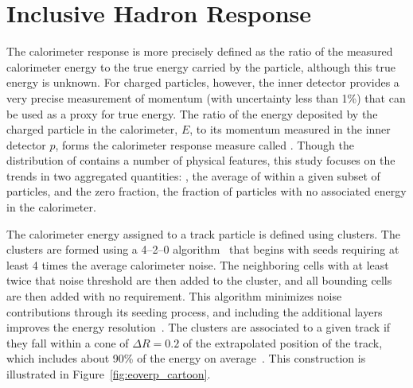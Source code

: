 
\section{Inclusive Hadron Response}
\label{sec:inclusive}

The calorimeter response is more precisely defined as the ratio of the measured calorimeter energy to the true energy carried by the particle, although this true energy is unknown. 
For charged particles, however, the inner detector provides a very precise measurement of momentum (with uncertainty less than 1\%) that can be used as a proxy for true energy.
The ratio of the energy deposited by the charged particle in the calorimeter, $E$, to its momentum measured in the inner detector $p$, forms the calorimeter response measure called \ep.
Though the distribution of \ep contains a number of physical features, this study focuses on the trends in two aggregated quantities: \epav, the average of \ep within a given subset of particles, and the zero fraction, the fraction of particles with no associated energy in the calorimeter.

The calorimeter energy assigned to a track particle is defined using clusters. 
The clusters are formed using a 4--2--0 algorithm~\cite{TopoClusters} that begins with seeds requiring at least 4 times the average calorimeter noise. 
The neighboring cells with at least twice that noise threshold are then added to the cluster, and all bounding cells are then added with no requirement. 
This algorithm minimizes noise contributions through its seeding process, and including the additional layers improves the energy resolution~\cite{Speckmayer}.
The clusters are associated to a given track if they fall within a cone of $\Delta R = 0.2$ of the extrapolated position of the track, which includes about 90\% of the energy on average~\cite{PERF-2011-05}.
This construction is illustrated in Figure~\ref{fig:eoverp_cartoon}.

